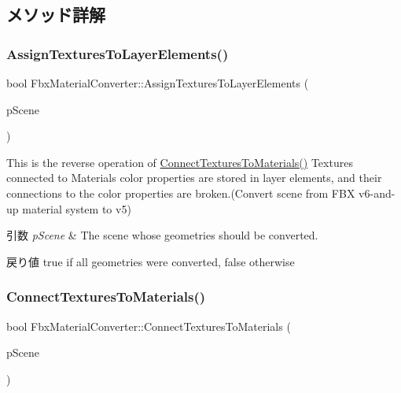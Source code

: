 \subsection{メソッド詳解}
\mbox{\label{class_fbx_material_converter_aa25fab49c96d5383012f959ef609c1d5}} 
\subsubsection{\texorpdfstring{Assign\+Textures\+To\+Layer\+Elements()}{AssignTexturesToLayerElements()}}
{\footnotesize\ttfamily bool Fbx\+Material\+Converter\+::\+Assign\+Textures\+To\+Layer\+Elements (\begin{DoxyParamCaption}\item[{\hyperlink{class_fbx_scene}{Fbx\+Scene} \&}]{p\+Scene }\end{DoxyParamCaption})}

This is the reverse operation of \hyperlink{class_fbx_material_converter_a46530019d28101c557c8861ed22f2930}{Connect\+Textures\+To\+Materials()} Textures connected to Materials\textquotesingle{} color properties are stored in layer elements, and their connections to the color properties are broken.(Convert scene from F\+BX v6-\/and-\/up material system to v5) 
\begin{DoxyParams}{引数}
{\em p\+Scene} & The scene whose geometries should be converted. \\
\hline
\end{DoxyParams}
\begin{DoxyReturn}{戻り値}
true if all geometries were converted, false otherwise 
\end{DoxyReturn}
\mbox{\label{class_fbx_material_converter_a46530019d28101c557c8861ed22f2930}} 
\subsubsection{\texorpdfstring{Connect\+Textures\+To\+Materials()}{ConnectTexturesToMaterials()}\hspace{0.1cm}{\footnotesize\ttfamily [1/2]}}
{\footnotesize\ttfamily bool Fbx\+Material\+Converter\+::\+Connect\+Textures\+To\+Materials (\begin{DoxyParamCaption}\item[{\hyperlink{class_fbx_scene}{Fbx\+Scene} \&}]{p\+Scene }\end{DoxyParamCaption})}

